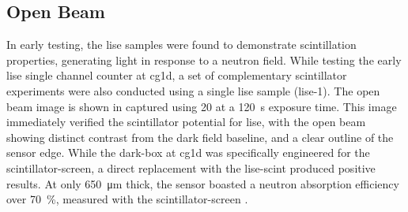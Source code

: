 \documentclass[../../../main.tex]{subfiles}%
\begin{document}
%
    \subsection{Open Beam}%
    \label{sec:chapter-4:scintillator-single:open-beam}%
    In early testing, the \gls{lise} samples were found to demonstrate scintillation properties, generating light in response to a neutron field.
    While testing the early \gls{lise} single channel counter at \gls{cg1d}, a set of complementary scintillator experiments were also conducted using a single \gls{lise} sample (\gls{lise-1}).
    The open beam image is shown in  captured using \SI{20}{\frames} at a \SI{120}{\second} exposure time.
    This image immediately verified the scintillator potential for \gls{lise}, with the open beam showing distinct contrast from the dark field baseline, and a clear outline of the sensor edge.
    While the \gls{dark-box} at \gls{cg1d} was specifically engineered for the \gls{scintillator-screen}, a direct replacement with the \gls{lise-scint} produced positive results.
    At only \SI{650}{\micro\meter} thick, the sensor boasted a neutron absorption efficiency over \SI{70}{\percent}, measured with the \gls{scintillator-screen} \cite{Lukosi_2016a}.
\end{document}

